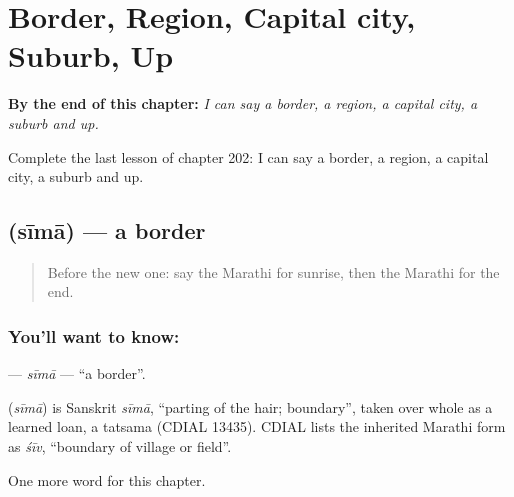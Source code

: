 
\chapter{Border, Region, Capital city, Suburb, Up}
\label{ch:mr-border-region-capital-city-suburb-up}

\begin{chapteropening}
\textbf{By the end of this chapter:} \emph{I can say a border, a region, a capital city, a suburb and up.}

Complete the last lesson of chapter 202: I can say a border, a region, a capital city, a suburb and up.
\end{chapteropening}

\section[\texorpdfstring{\mr{सीमा} (sīmā)}{सीमा (sīmā)}]{ (sīmā) — a border}

\label{lesson:MR-C202-sima}



\begin{quote}
Before the new one: say the Marathi for sunrise, then the Marathi for the end.
\end{quote}

\subsection*{You'll want to know: }
\textbf{} — \emph{sīmā} — \textquotedblleft{}a border\textquotedblright{}.

\begin{cousinweb}
\textbf{} (\emph{sīmā}) is Sanskrit \emph{sīmā}, \textquotedblleft{}parting of the hair; boundary\textquotedblright{}, taken over whole as a learned loan, a tatsama (CDIAL 13435). CDIAL lists the inherited Marathi form as \emph{śīv}, \textquotedblleft{}boundary of village or field\textquotedblright{}.
\end{cousinweb}

\begin{grammarlens}[title={What you've built}]
One more word for this chapter.
\end{grammarlens}

